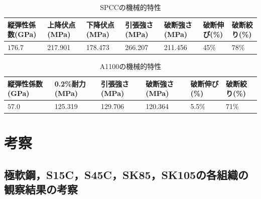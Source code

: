 \documentclass[10pt，a4j]{jsarticle}
\begin{document}
      \begin{table}[H]
        \centering
        \caption{SPCCの機械的特性}
        \label{my-label}
        \footnotesize
        \begin{tabular}{lllllll}
          縦弾性係数(GPa)      & 上降伏点(MPa) & 下降伏点(MPa) & 引張強さ(MPa) & 破断強さ(MPa) & 破断伸び(\%) & 破断絞り(\%) \\ \hline
          $176.7$ & 217.901   & 178.473   & 266.207   & 211.456   & 45\%        & 78\%       
        \end{tabular}
      \end{table}
      \begin{table}[H]
        \centering
        \caption{A1100の機械的特性}
        \label{my-label}
        \footnotesize
        \begin{tabular}{llllll}
          縦弾性係数(GPa)    & 0.2\%耐力(MPa) & 引張強さ(MPa) & 破断強さ(MPa) & 破断伸び(\%) & 破断絞り(\%) \\ \hline
          $57.0$ & 125.319            & 129.706   & 120.364   & 5.5\%        & 71\%       
        \end{tabular}
      \end{table}

\section{考察}
  \subsection{極軟鋼，S15C，S45C，SK85，SK105の各組織の観察結果の考察}
\end{document}
